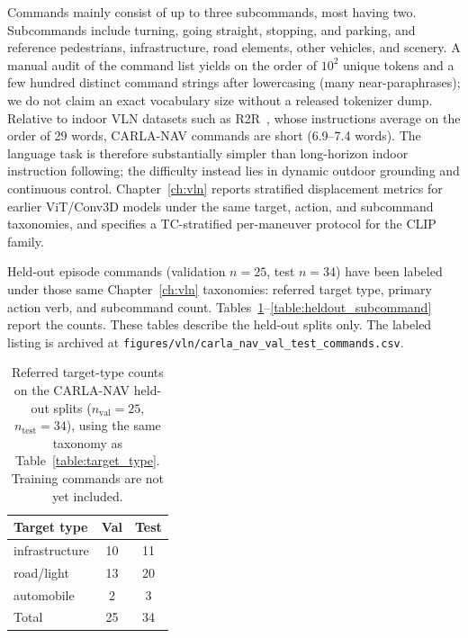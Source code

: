 Commands mainly consist of up to three subcommands, most having two. Subcommands include turning, going straight, stopping, and parking, and reference pedestrians, infrastructure, road elements, other vehicles, and scenery. A manual audit of the command list yields on the order of $10^2$ unique tokens and a few hundred distinct command strings after lowercasing (many near-paraphrases); we do not claim an exact vocabulary size without a released tokenizer dump. Relative to indoor VLN datasets such as R2R~\cite{anderson2018vision}, whose instructions average on the order of 29 words, CARLA-NAV commands are short (6.9--7.4 words). The language task is therefore substantially simpler than long-horizon indoor instruction following; the difficulty instead lies in dynamic outdoor grounding and continuous control. Chapter~\ref{ch:vln} reports stratified displacement metrics for earlier ViT/Conv3D models under the same target, action, and subcommand taxonomies, and specifies a TC-stratified per-maneuver protocol for the CLIP family.

Held-out episode commands (validation $n=25$, test $n=34$) have been labeled under those same Chapter~\ref{ch:vln} taxonomies: referred target type, primary action verb, and subcommand count. Tables~\ref{table:heldout_target}--\ref{table:heldout_subcommand} report the counts. These tables describe the held-out splits only. The labeled listing is archived at \texttt{figures/vln/carla\_nav\_val\_test\_commands.csv}.

\begin{table}[ht]
\begin{center}
\begin{tabular}{|l|c|c|}
\hline
Target type & Val & Test \\ \hline
infrastructure & 10 & 11 \\ \hline
road/light & 13 & 20 \\ \hline
automobile & 2 & 3 \\ \hline
Total & 25 & 34 \\ \hline
\end{tabular}
\end{center}
\caption[Held-out target-type counts]{Referred target-type counts on the CARLA-NAV held-out splits ($n_{\mathrm{val}}=25$, $n_{\mathrm{test}}=34$), using the same taxonomy as Table~\ref{table:target_type}. Training commands are not yet included.}
\label{table:heldout_target}
\end{table}

